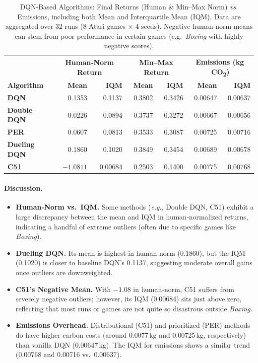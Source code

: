 \begin{table}[htbp]
	\caption{DQN‐Based Algorithms: Final Returns (Human \& Min--Max Norm) \emph{vs.} Emissions,
		including both Mean and Interquartile Mean (IQM). 
		Data are aggregated over 32 runs (8 Atari games $\times$ 4 seeds). 
		Negative human‐norm means can stem from poor performance in certain games 
		(e.g.\ \emph{Boxing} with highly negative scores).}
	\label{tab:dqn_overall_iqm}
	\centering
	\begin{tabular}{lrrrrrr}
		\toprule
		& \multicolumn{2}{c}{\textbf{Human‐Norm Return}} 
		& \multicolumn{2}{c}{\textbf{Min--Max Return}}
		& \multicolumn{2}{c}{\textbf{Emissions (kg\,CO\textsubscript{2})}} \\
		\cmidrule(lr){2-3}\cmidrule(lr){4-5}\cmidrule(lr){6-7}
		\textbf{Algorithm}
		& \textbf{Mean} & \textbf{IQM}
		& \textbf{Mean} & \textbf{IQM}
		& \textbf{Mean} & \textbf{IQM} \\
		\midrule
		\textbf{DQN} 
		& 0.1353 & 0.1137 
		& 0.3802 & 0.3426 
		& 0.00647 & 0.00637 \\
		\textbf{Double DQN} 
		& 0.0226 & 0.0894 
		& 0.3737 & 0.3272 
		& 0.00667 & 0.00656 \\
		\textbf{PER} 
		& 0.0607 & 0.0813 
		& 0.3533 & 0.3087 
		& 0.00725 & 0.00716 \\
		\textbf{Dueling DQN} 
		& 0.1860 & 0.1020 
		& 0.3849 & 0.3454 
		& 0.00689 & 0.00678 \\
		\textbf{C51} 
		& $-1.0811$ & 0.00684 
		& 0.2503 & 0.1400 
		& 0.00775 & 0.00768 \\
		\bottomrule
	\end{tabular}
\end{table}

\paragraph{Discussion.}
\begin{itemize}
	\item \textbf{Human‐Norm vs.\ IQM.} 
	Some methods (\emph{e.g.}, Double DQN, C51) 
	exhibit a large discrepancy between the mean and IQM in human‐normalized returns, 
	indicating a handful of extreme outliers (often due to specific games like \emph{Boxing}).
	\item \textbf{Dueling DQN.} 
	Its mean is highest in human‐norm (0.1860), 
	but the IQM (0.1020) is closer to baseline DQN’s 0.1137, 
	suggesting moderate overall gains once outliers are downweighted.
	\item \textbf{C51’s Negative Mean.} 
	With $-1.08$ in human‐norm, C51 suffers from severely negative outliers; 
	however, its IQM (0.00684) sits just above zero, reflecting that most runs or games 
	are not quite so disastrous outside \emph{Boxing}.
	\item \textbf{Emissions Overhead.} 
	Distributional (C51) and prioritized (PER) methods do have higher carbon costs 
	(around 0.0077\,kg and 0.00725\,kg, respectively) than vanilla DQN (0.00647\,kg). 
	The IQM for emissions shows a similar trend (0.00768 and 0.00716 vs.\ 0.00637).
\end{itemize}

